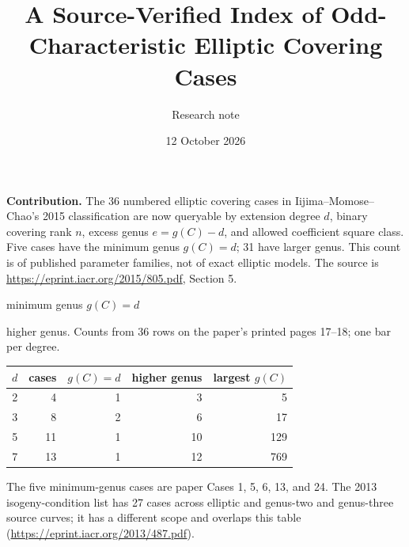 \documentclass[10pt]{article}
\title{A Source-Verified Index of Odd-Characteristic Elliptic Covering Cases}
\author{Research note}
\date{12 October 2026}
\begin{document}
\maketitle
\noindent\textbf{Contribution.} The 36 numbered elliptic covering cases in
Iijima--Momose--Chao's 2015 classification are now queryable by extension degree
$d$, binary covering rank $n$, excess genus $e=g(C)-d$, and allowed coefficient
square class. Five cases have the minimum genus $g(C)=d$; 31 have larger genus.
This count is of published parameter families, not of exact elliptic models.
The source is \url{https://eprint.iacr.org/2015/805.pdf}, Section 5.

\begin{center}

\small\colorbox{minimum}{\strut\phantom{xx}} minimum genus $g(C)=d$ \quad
\colorbox{higher}{\strut\phantom{xx}} higher genus. Counts from 36 rows on
the paper's printed pages 17--18; one bar per degree.
\end{center}

\begin{center}
\begin{tabular}{rrrrr}\toprule
$d$ & cases & $g(C)=d$ & higher genus & largest $g(C)$\\\midrule
2&4&1&3&5\\
3&8&2&6&17\\
5&11&1&10&129\\
7&13&1&12&769\\\bottomrule
\end{tabular}
\end{center}

\noindent The five minimum-genus cases are paper Cases 1, 5, 6, 13, and 24.
The 2013 isogeny-condition list has 27 cases across elliptic and genus-two and
genus-three source curves; it has a different scope and overlaps this table
(\url{https://eprint.iacr.org/2013/487.pdf}).
\end{document}
